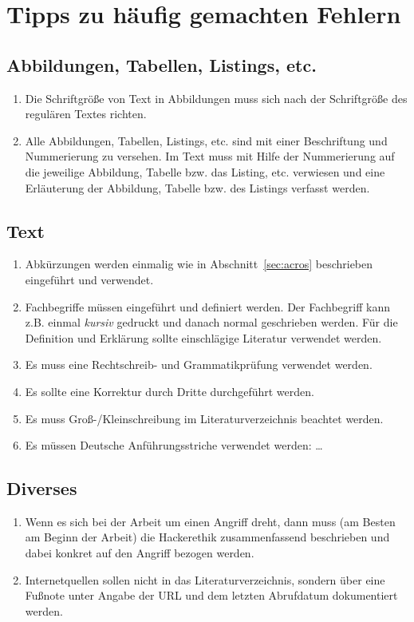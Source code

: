 
\section{Tipps zu häufig gemachten Fehlern}

\subsection{Abbildungen, Tabellen, Listings, etc.}
\begin{enumerate}
 \item Die Schriftgröße von Text in Abbildungen muss sich nach der Schriftgröße
 des regulären Textes richten.
 \item Alle Abbildungen, Tabellen, Listings, etc. sind mit einer Beschriftung
 und Nummerierung zu versehen. Im Text muss mit Hilfe der Nummerierung auf
 die jeweilige Abbildung, Tabelle bzw. das Listing, etc. verwiesen und eine
 Erläuterung der Abbildung, Tabelle bzw. des Listings verfasst werden.
\end{enumerate}

\subsection{Text}
\begin{enumerate}
 \item Abkürzungen werden einmalig wie in Abschnitt~\ref{sec:acros} beschrieben eingeführt
 und verwendet.
 \item Fachbegriffe müssen eingeführt und definiert werden. Der Fachbegriff kann
 z.B. einmal \textit{kursiv} gedruckt und danach normal geschrieben werden. Für
 die Definition und Erklärung sollte einschlägige Literatur verwendet werden.
 \item Es muss eine Rechtschreib- und Grammatikprüfung verwendet werden.
 \item Es sollte eine Korrektur durch Dritte durchgeführt werden.
 \item Es muss Groß-/Kleinschreibung im Literaturverzeichnis beachtet werden.
 \item Es müssen Deutsche Anführungsstriche verwendet werden: \glqq \dots\grqq
\end{enumerate}

\subsection{Diverses}
\begin{enumerate}
 \item Wenn es sich bei der Arbeit um einen Angriff dreht, dann muss
 (am Besten am Beginn der Arbeit) die Hackerethik zusammenfassend beschrieben
 und dabei konkret auf den Angriff bezogen werden.
 \item Internetquellen sollen nicht in das Literaturverzeichnis, sondern über
 eine Fußnote unter Angabe der URL und dem letzten Abrufdatum dokumentiert
 werden.
\end{enumerate}
